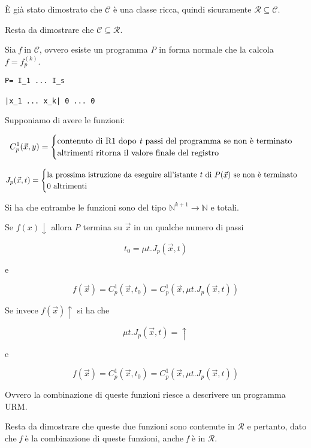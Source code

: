 È già stato dimostrato che $ \mathcal{C} $ è una classe ricca, quindi sicuramente
$ \mathcal{R} \subseteq \mathcal{C} $.

Resta da dimostrare che $ \mathcal{C} \subseteq \mathcal{R} $.

Sia \textit{f} in $ \mathcal{C} $, ovvero esiste un programma \emph{P} in forma normale
che la calcola $f = f_p^{(k)}$.

\begin{verbatim}
P= I_1 ... I_s

|x_1 ... x_k| 0 ... 0
\end{verbatim}

Supponiamo di avere le funzioni:

$$
C_{p}^1(\vec{x},y) = \begin{cases}
\text{contenuto di R1 dopo \textit{t} passi del programma se non è terminato} \\
\text{altrimenti ritorna il valore finale del registro}
\end{cases} 
$$

$$
J_p(\vec{x},t) = \begin{cases}
\text{la prossima istruzione da eseguire all'istante \textit{t} di } P(\vec{x}) \text{ se non è terminato}\\
0 \text{ altrimenti }
\end{cases}
$$

Si ha che entrambe le funzioni sono del tipo $\mathbb{N}^{k+1} \rightarrow \mathbb{N} $
e totali.

Se $f(x)\downarrow$ allora \emph{P} termina su $\vec{x}$ in un qualche
numero di passi

$$
t_0 = \mu t.J_p(\vec{x}, t)
$$

e

$$
f(\vec{x}) = C_{p}^1(\vec{x}, t_0) =  C_{p}^1(\vec{x}, \mu t.J_p(\vec{x}, t))
$$

Se invece $f(\vec{x})\uparrow$ si ha che

$$
\mu t.J_p(\vec{x}, t) = \uparrow
$$

e

$$
f(\vec{x}) = C_{p}^1(\vec{x}, t_0) =  C_{p}^1(\vec{x}, \mu t.J_p(\vec{x}, t))
$$

Ovvero la combinazione di queste funzioni riesce a descrivere un programma URM.

Resta da dimostrare che queste due funzioni sono contenute in $ \mathcal{R} $ e pertanto, dato che \textit{f} è la combinazione di queste funzioni, anche \textit{f} è in $ \mathcal{R} $.
